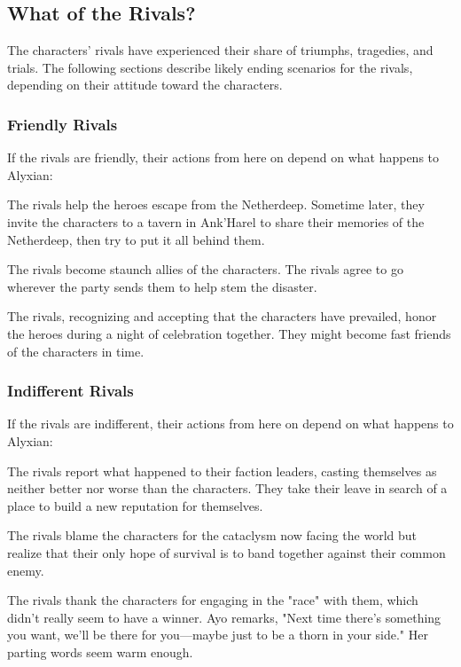 \documentclass[10pt,a4paper,twoside,bg=print,twocolumn,openany,nodeprecatedcode]{dndbook}
\begin{document}
\subsection{What of the Rivals?}
The characters' rivals have experienced their share of triumphs, tragedies, and trials. The following sections describe likely ending scenarios for the rivals, depending on their attitude toward the characters.

\subsubsection{Friendly Rivals}
If the rivals are friendly, their actions from here on depend on what happens to Alyxian:


\begin{description}[nolistsep]
\item[Alyxian Is Killed.]
The rivals help the heroes escape from the Netherdeep. Sometime later, they invite the characters to a tavern in Ank'Harel to share their memories of the Netherdeep, then try to put it all behind them.
\item[Alyxian Is Unleashed.]
The rivals become staunch allies of the characters. The rivals agree to go wherever the party sends them to help stem the disaster.
\item[Alyxian Is Redeemed.]
The rivals, recognizing and accepting that the characters have prevailed, honor the heroes during a night of celebration together. They might become fast friends of the characters in time.
\end{description}

\subsubsection{Indifferent Rivals}
If the rivals are indifferent, their actions from here on depend on what happens to Alyxian:


\begin{description}[nolistsep]
\item[Alyxian Is Killed.]
The rivals report what happened to their faction leaders, casting themselves as neither better nor worse than the characters. They take their leave in search of a place to build a new reputation for themselves.
\item[Alyxian Is Unleashed.]
The rivals blame the characters for the cataclysm now facing the world but realize that their only hope of survival is to band together against their common enemy.
\item[Alyxian Is Redeemed.]
The rivals thank the characters for engaging in the "race" with them, which didn't really seem to have a winner. Ayo remarks, "Next time there's something you want, we'll be there for you—maybe just to be a thorn in your side." Her parting words seem warm enough.
\end{description}
\end{document}
